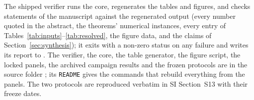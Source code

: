 The shipped verifier  runs the core, regenerates the tables and figures, and checks \nchecks{} statements of the manuscript against the regenerated output (every number quoted in the abstract, the theorems' numerical instances, every entry of Tables~\ref{tab:inputs}--\ref{tab:resolved}, the figure data, and the claims of Section~\ref{sec:synthesis}); it exits with a non-zero status on any failure and writes its report to . The verifier, the core, the table generator, the figure script, the locked panels, the archived campaign results and the frozen protocols are in the source folder ; its \texttt{README} gives the commands that rebuild everything from the panels. The two protocols are reproduced verbatim in SI Section~S13 with their freeze dates.
